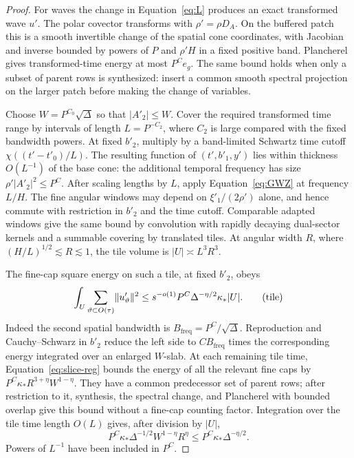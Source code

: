 \begin{proof}
For waves the change in Equation~\eqref{eq:L} produces an exact
transformed wave $u'$.  The polar covector transforms with
$\rho'=\rho D_A$.  On the buffered patch this is a smooth
invertible change of the spatial cone coordinates, with Jacobian
and inverse bounded by powers of $P$ and $\rho'H$ in a fixed
positive band.  Plancherel gives transformed-time energy at most
$P^Ce_g$.  The same bound holds when only a subset of parent rows
is synthesized: insert a common smooth spectral projection on the
larger patch before making the change of variables.

Choose $W=P^{C_0}\sqrt\Delta$ so that $|A'_2|\le W$.
Cover the required transformed time range by intervals of length
$L=P^{-C_2}$, where $C_2$ is large compared with the fixed bandwidth
powers.  At fixed $b'_2$, multiply by a band-limited Schwartz time
cutoff $\chi((t'-t'_0)/L)$.  The resulting function of
$(t',b'_1,y')$ lies within thickness $O(L^{-1})$ of the base cone:
the additional temporal frequency has size
$\rho'|A'_2|^2\le P^C$.  After scaling lengths by $L$, apply
Equation~\eqref{eq:GWZ} at frequency $L/H$.  The fine angular
windows may depend on $\xi'_1/(2\rho')$ alone, and hence commute
with restriction in $b'_2$ and the time cutoff.  Comparable adapted
windows give the same bound by convolution with rapidly decaying
dual-sector kernels and a summable covering by translated tiles.
At angular width $R$, where
$(H/L)^{1/2}\lesssim R\lesssim1$, the tile volume is
$|U|\asymp L^3R^3$.

The fine-cap square energy on such a tile, at fixed $b'_2$, obeys
\begin{equation}
 \int_U\sum_{\vartheta\subset O(\tau)}
                 \lVert u'_{\vartheta}\rVert^2
 \le s^{-o(1)}P^C\Delta^{-\eta/2}\kappa_*|U|.
 \tag{tile}\label{eq:tile}
\end{equation}
Indeed the second spatial bandwidth is
$B_{\mathrm{freq}}=P^C/\sqrt\Delta$.  Reproduction and
Cauchy--Schwarz in $b'_2$ reduce the left side to
$C B_{\mathrm{freq}}$ times the corresponding energy integrated
over an enlarged $W$-slab.  At each remaining tile time,
Equation~\eqref{eq:slice-reg} bounds the energy of all the relevant
fine caps by $P^C\kappa_*R^{3+\eta}W^{1-\eta}$.
They have a common predecessor set of parent rows; after restriction
to it, synthesis, the spectral change, and Plancherel with bounded
overlap give this bound without a fine-cap counting factor.
Integration over the tile time length $O(L)$ gives, after division
by $|U|$,
\[
 P^C\kappa_*\Delta^{-1/2}W^{1-\eta}R^\eta
 \le P^C\kappa_*\Delta^{-\eta/2}.
\]
Powers of $L^{-1}$ have been included in $P^C$.


\end{proof}
